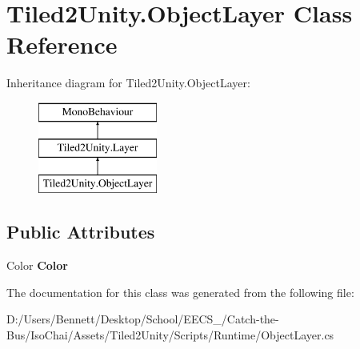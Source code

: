 \hypertarget{class_tiled2_unity_1_1_object_layer}{}\section{Tiled2\+Unity.\+Object\+Layer Class Reference}
\label{class_tiled2_unity_1_1_object_layer}
Inheritance diagram for Tiled2\+Unity.\+Object\+Layer\+:\begin{figure}[H]
\begin{center}
\leavevmode
\includegraphics[height=3.000000cm]{class_tiled2_unity_1_1_object_layer}
\end{center}
\end{figure}
\subsection*{Public Attributes}
\begin{DoxyCompactItemize}
\item 
\mbox{\label{class_tiled2_unity_1_1_object_layer_a4089059fb20eea72f30158d311868e54}} 
Color {\bfseries Color}
\end{DoxyCompactItemize}


The documentation for this class was generated from the following file\+:\begin{DoxyCompactItemize}
\item 
D\+:/\+Users/\+Bennett/\+Desktop/\+School/\+E\+E\+C\+S\+\_/\+Catch-\/the-\/\+Bus/\+Iso\+Chai/\+Assets/\+Tiled2\+Unity/\+Scripts/\+Runtime/Object\+Layer.\+cs\end{DoxyCompactItemize}
